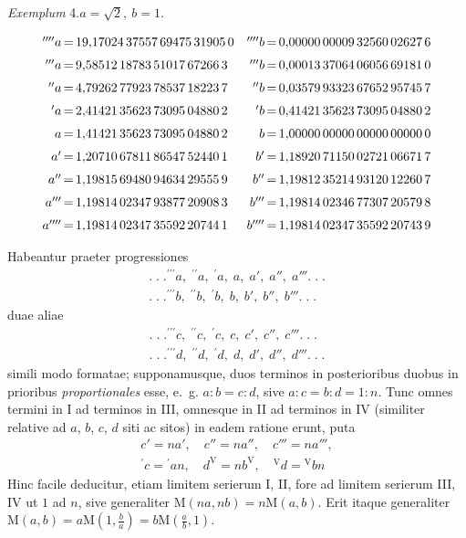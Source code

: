 \begin{center}\textit{Exemplum} 4.\quad $a=\surd 2,\ b=1$.\end{center}
\begingroup\small\setlength{\arraycolsep}{0pt}
\[\begin{array}{r@{\,=\,}l@{\quad}r@{\,=\,}l}
{}^{\prime\prime\prime\prime}a&19{,}17024\,37557\,69475\,31905\,0&{}^{\prime\prime\prime\prime}b&0{,}00000\,00009\,32560\,02627\,6\\[6pt]
{}^{\prime\prime\prime}a&9{,}58512\,18783\,51017\,67266\,3&{}^{\prime\prime\prime}b&0{,}00013\,37064\,06056\,69181\,0\\[6pt]
{}^{\prime\prime}a&4{,}79262\,77923\,78537\,18223\,7&{}^{\prime\prime}b&0{,}03579\,93323\,67652\,95745\,7\\[6pt]
{}^{\prime}a&2{,}41421\,35623\,73095\,04880\,2&{}^{\prime}b&0{,}41421\,35623\,73095\,04880\,2\\[6pt]
a&1{,}41421\,35623\,73095\,04880\,2&b&1{,}00000\,00000\,00000\,00000\,0\\[6pt]
a'&1{,}20710\,67811\,86547\,52440\,1&b'&1{,}18920\,71150\,02721\,06671\,7\\[6pt]
a''&1{,}19815\,69480\,94634\,29555\,9&b''&1{,}19812\,35214\,93120\,12260\,7\\[6pt]
a'''&1{,}19814\,02347\,93877\,20908\,3&b'''&1{,}19814\,02346\,77307\,20579\,8\\[6pt]
a''''&1{,}19814\,02347\,35592\,20744\,1&b''''&1{,}19814\,02347\,35592\,20743\,9
\end{array}
\]\endgroup


Habeantur praeter progressiones
\[
\begin{array}{l}
.\;.\;.{}^{\prime\prime\prime}a,\;{}^{\prime\prime}a,\;{}^{\prime}a,\; a,\; a',\; a'',\; a'''.\;.\;.\\[6pt]
.\;.\;.{}^{\prime\prime\prime}b,\;{}^{\prime\prime}b,\;{}^{\prime}b,\; b,\; b',\; b'',\; b'''.\;.\;.
\end{array}
\]
duae aliae
\[
\begin{array}{l}
.\;.\;.{}^{\prime\prime\prime}c,\;{}^{\prime\prime}c,\;{}^{\prime}c,\; c,\; c',\; c'',\; c'''.\;.\;.\\[6pt]
.\;.\;.{}^{\prime\prime\prime}d,\;{}^{\prime\prime}d,\;{}^{\prime}d,\; d,\; d',\; d'',\; d'''.\;.\;.
\end{array}
\]
simili modo formatae; supponamusque, duos terminos in posterioribus duobus in
prioribus \textit{proportionales} esse, e.\ g. $a:b=c:d$, sive $a:c=b:d=1:n$.
Tunc omnes termini in I ad terminos in III, omnesque in II ad terminos in IV
(similiter relative ad $a$, $b$, $c$, $d$ siti ac sitos) in eadem ratione erunt, puta
\[
\begin{gathered}c'=na',\quad c''=na'',\quad c'''=na''',\\ {}^{\prime}c={}^{\prime}an,\quad d^{\mathrm V}=nb^{\mathrm V},\quad{}^{\mathrm V}d={}^{\mathrm V}bn\end{gathered}
\]
Hinc facile deducitur, etiam limitem serierum I, II, fore ad limitem serierum
III, IV ut $1$ ad $n$, sive generaliter $\mathrm M(na,nb)=n\mathrm M(a,b)$.
Erit itaque generaliter $\mathrm M(a,b)=a\mathrm M(1,\frac{b}{a})=b\mathrm M(\frac{a}{b},1)$.

